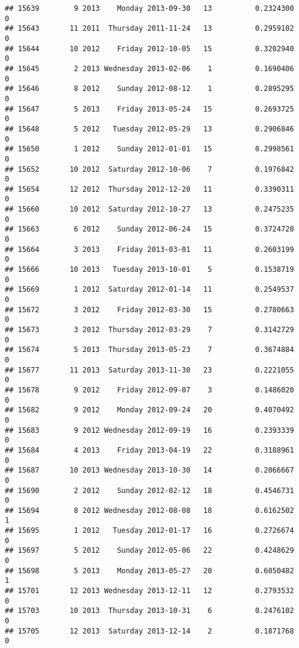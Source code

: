 \documentclass[
]{article}
\begin{document}
\begin{verbatim}
## 15639        9 2013    Monday 2013-09-30   13          0.2324300             0
## 15643       11 2011  Thursday 2011-11-24   13          0.2959102             0
## 15644       10 2012    Friday 2012-10-05   15          0.3202940             0
## 15645        2 2013 Wednesday 2013-02-06    1          0.1690406             0
## 15646        8 2012    Sunday 2012-08-12    1          0.2895295             0
## 15647        5 2013    Friday 2013-05-24   15          0.2693725             0
## 15648        5 2012   Tuesday 2012-05-29   13          0.2906846             0
## 15650        1 2012    Sunday 2012-01-01   15          0.2998561             0
## 15652       10 2012  Saturday 2012-10-06    7          0.1976842             0
## 15654       12 2012  Thursday 2012-12-20   11          0.3390311             0
## 15660       10 2012  Saturday 2012-10-27   13          0.2475235             0
## 15663        6 2012    Sunday 2012-06-24   15          0.3724728             0
## 15664        3 2013    Friday 2013-03-01   11          0.2603199             0
## 15666       10 2013   Tuesday 2013-10-01    5          0.1538719             0
## 15669        1 2012  Saturday 2012-01-14   11          0.2549537             0
## 15672        3 2012    Friday 2012-03-30   15          0.2780663             0
## 15673        3 2012  Thursday 2012-03-29    7          0.3142729             0
## 15674        5 2013  Thursday 2013-05-23    7          0.3674884             0
## 15677       11 2013  Saturday 2013-11-30   23          0.2221055             0
## 15678        9 2012    Friday 2012-09-07    3          0.1486020             0
## 15682        9 2012    Monday 2012-09-24   20          0.4070492             0
## 15683        9 2012 Wednesday 2012-09-19   16          0.2393339             0
## 15684        4 2013    Friday 2013-04-19   22          0.3188961             0
## 15687       10 2013 Wednesday 2013-10-30   14          0.2066667             0
## 15690        2 2012    Sunday 2012-02-12   18          0.4546731             0
## 15694        8 2012 Wednesday 2012-08-08   18          0.6162502             1
## 15695        1 2012   Tuesday 2012-01-17   16          0.2726674             0
## 15697        5 2012    Sunday 2012-05-06   22          0.4248629             0
## 15698        5 2013    Monday 2013-05-27   20          0.6050482             1
## 15701       12 2013 Wednesday 2013-12-11   12          0.2793532             0
## 15703       10 2013  Thursday 2013-10-31    6          0.2476102             0
## 15705       12 2013  Saturday 2013-12-14    2          0.1871768             0

\end{verbatim}
\end{document}
